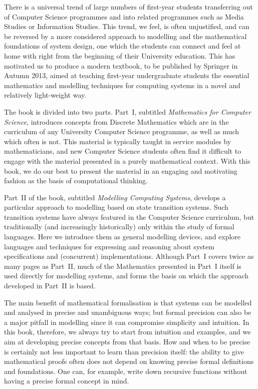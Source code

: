 \documentclass[sigconf]{acmart}
\begin{document}
There is a universal trend of large numbers of first-year students
transferring out of Computer Science programmes and into related
programmes such as Media Studies or Information Studies.  This trend,
we feel, is often unjustified, and can be reversed by a more
considered approach to modelling and the mathematical foundations of
system design, one which the students can connect and feel at home
with right from the beginning of their University education.  This has
motivated us to produce a modern textbook, to be published by Springer
in Autumn 2013, aimed at teaching first-year undergraduate students
the essential mathematics and modelling techniques for computing
systems in a novel and relatively light-weight way.

The book is divided into two parts.  Part~I, subtitled
\emph{Mathematics for Computer Science}, introduces concepts from
Discrete Mathematics which are in the curriculum of any University
Computer Science programme, as well as much which often is not.  This
material is typically taught in service modules by mathematicians, and
new Computer Science students often find it difficult to engage with
the material presented in a purely mathematical context.  With this
book, we do our best to present the material in an engaging and
motivating fashion as the basis of computational thinking.

Part~II of the book, subtitled \emph{Modelling Computing Systems},
develops a particular approach to modelling based on state transition
systems.  Such transition systems have always featured in the Computer
Science curriculum, but traditionally (and increasingly historically)
only within the study of formal languages.  Here we introduce them as
general modelling devices, and explore languages and techniques for
expressing and reasoning about system specifications and (concurrent)
implementations.  Although Part~I covers twice as many pages as
Part~II, much of the Mathematics presented in Part~I itself is used
directly for modelling systems, and forms the basis on which the
approach developed in Part~II is based.

The main benefit of mathematical formalisation is that systems can be
modelled and analysed in precise and unambiguous ways; but formal
precision can also be a major pitfall in modelling since it can
compromise simplicity and intuition. In this book, therefore, we
always try to start from intuition and examples, and we aim at
developing precise concepts from that basis. How and when to be
precise is certainly not less important to learn than precision
itself: the ability to give mathematical proofs often does not depend
on knowing precise formal definitions and foundations.  One can, for
example, write down recursive functions without having a precise
formal concept in mind.
\end{document}
